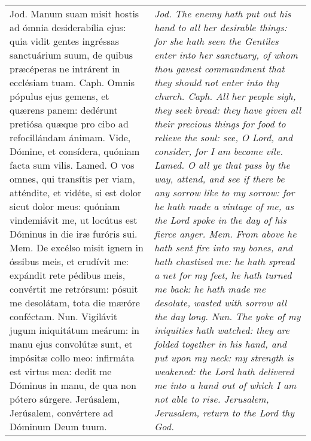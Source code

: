 \begin{tabular}{p{8cm} | p{8cm}}
Jod. Manum suam misit hostis ad ómnia desiderabília ejus: quia vidit gentes ingréssas sanctuárium suum, de quibus præcéperas ne intrárent in ecclésiam tuam.
Caph. Omnis pópulus ejus gemens, et quærens panem: dedérunt pretiósa quæque pro cibo ad refocillándam ánimam. Vide, Dómine, et consídera, quóniam facta sum vilis.
Lamed. O vos omnes, qui transítis per viam, atténdite, et vidéte, si est dolor sicut dolor meus: quóniam vindemiávit me, ut locútus est Dóminus in die iræ furóris sui.
Mem. De excélso misit ignem in óssibus meis, et erudívit me: expándit rete pédibus meis, convértit me retrórsum: pósuit me desolátam, tota die mæróre conféctam.
Nun. Vigilávit jugum iniquitátum meárum: in manu ejus convolútæ sunt, et impósitæ collo meo: infirmáta est virtus mea: dedit me Dóminus in manu, de qua non pótero súrgere.
Jerúsalem, Jerúsalem, convértere ad Dóminum Deum tuum.
& \textit{Jod. The enemy hath put out his hand to all her desirable things: for she hath seen the Gentiles enter into her sanctuary, of whom thou gavest commandment that they should not enter into thy church.
Caph. All her people sigh, they seek bread: they have given all their precious things for food to relieve the soul: see, O Lord, and consider, for I am become vile.
Lamed. O all ye that pass by the way, attend, and see if there be any sorrow like to my sorrow: for he hath made a vintage of me, as the Lord spoke in the day of his fierce anger.
Mem. From above he hath sent fire into my bones, and hath chastised me: he hath spread a net for my feet, he hath turned me back: he hath made me desolate, wasted with sorrow all the day long.
Nun. The yoke of my iniquities hath watched: they are folded together in his hand, and put upon my neck: my strength is weakened: the Lord hath delivered me into a hand out of which I am not able to rise.
Jerusalem, Jerusalem, return to the Lord thy God.}
\end{tabular}